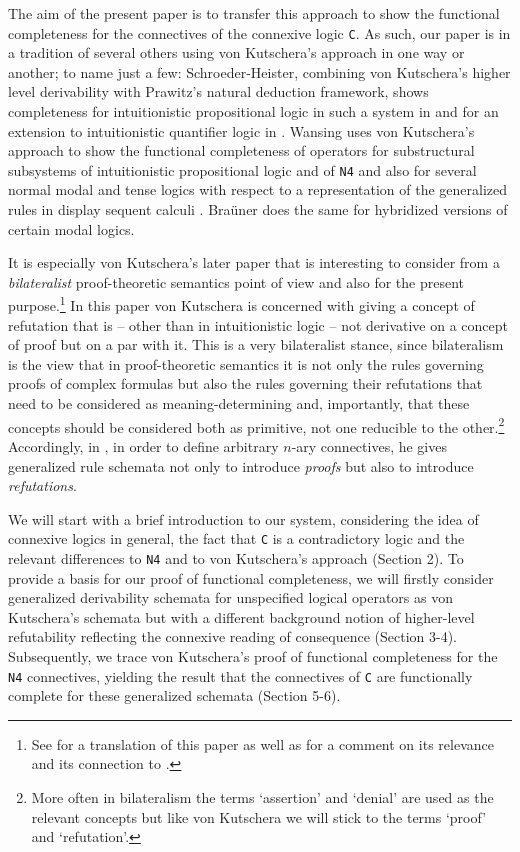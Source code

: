 \documentclass{article}%
\theoremstyle{break}
\begin{document}
The aim of the present paper is to transfer this approach to show the functional completeness for the connectives of the connexive logic \texttt{C}.
As such, our paper is in a tradition of several others using von Kutschera's approach in one way or another; to name just a few: 
Schroeder-Heister, combining von Kutschera's higher level derivability with Prawitz's natural deduction framework, shows completeness for intuitionistic propositional logic in such a system in
\cite{PSH1984b} and for an extension to intuitionistic quantifier logic in \cite{PSH1984a}. 
Wansing uses von Kutschera's approach to show the functional completeness of operators for substructural subsystems of intuitionistic propositional logic \cite{Wansing1993a} and of \texttt{N4} \cite[Ch. 7]{Wansing1993b} and also for several normal modal and tense logics with respect to a representation of the generalized rules in display sequent calculi \cite{Wansing1996}.
Braüner \cite{Brauner2005} does the same for hybridized versions of certain modal logics.

It is especially von Kutschera's later paper \cite{Kutschera1969} that is interesting to consider from a \emph{bilateralist} proof-theoretic semantics point of view and also for the present purpose.\footnote{See \cite{TranslationKutschera} for a translation of this paper as well as \cite{Ayhancomment} for a comment on its relevance and its connection to \cite{Kutschera1968}.}
In this paper von Kutschera is concerned with giving a concept of refutation that is -- other than in intuitionistic logic -- not derivative on a concept of proof but on a par with it.
This is a very bilateralist stance, since bilateralism is the view that in proof-theoretic semantics it is not only the rules governing proofs of complex formulas but also the rules governing their refutations that need to be considered as meaning-determining and, importantly, that these concepts should be considered both as primitive, not one reducible to the other.\footnote{More often in bilateralism the terms `assertion' and `denial' are used as the relevant concepts but like von Kutschera we will stick to the terms `proof' and `refutation'.}
Accordingly, in \cite{Kutschera1969}, in order to define arbitrary $n$-ary connectives, he gives generalized rule schemata not only to introduce \emph{proofs} but also to introduce \emph{refutations}. 

We will start with a brief introduction to our system, considering the idea of connexive logics in general, the fact that \texttt{C} is a contradictory logic and the relevant differences to \texttt{N4} and to von Kutschera's approach (Section 2). 
To provide a basis for our proof of functional completeness, we will firstly consider generalized derivability schemata for unspecified logical operators as von Kutschera's schemata but with a different background notion of higher-level refutability reflecting the connexive reading of consequence (Section 3-4). 
Subsequently, we trace von Kutschera's proof of functional completeness for the \texttt{N4} connectives, yielding the result that the connectives of \texttt{C} are functionally complete for these generalized schemata (Section 5-6).
\end{document}
